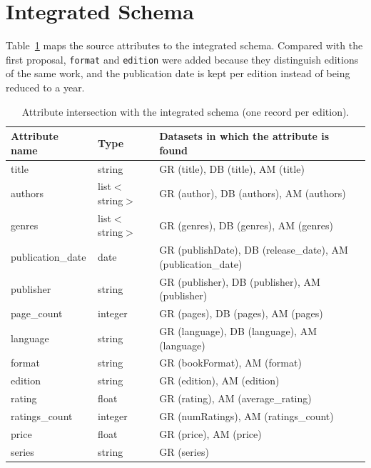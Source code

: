 \documentclass[runningheads]{llncs}
\begin{document}
\section{Integrated Schema}

Table~\ref{tab:schema} maps the source attributes to the integrated schema.
Compared with the first proposal, \texttt{format} and \texttt{edition} were
added because they distinguish editions of the same work, and the publication
date is kept per edition instead of being reduced to a year.

\begin{table}[htbp]
\centering
\begin{threeparttable}
\caption{Attribute intersection with the integrated schema (one record per edition).}
\label{tab:schema}
\footnotesize\setlength{\tabcolsep}{4pt}
\begin{tabularx}{\textwidth}{|l|l|>{\RaggedRight\arraybackslash}X|}
\hline
\textbf{Attribute name} & \textbf{Type} & \textbf{Datasets in which the attribute is found} \\
\hline
title             & string           & GR (title), DB (title), AM (title) \\
authors           & list$<$string$>$ & GR (author), DB (authors), AM (authors) \\
genres            & list$<$string$>$ & GR (genres), DB (genres), AM (genres) \\
publication\_date & date             & GR (publishDate), DB (release\_date), AM (publication\_date) \\
publisher         & string           & GR (publisher), DB (publisher), AM (publisher) \\
page\_count       & integer          & GR (pages), DB (pages), AM (pages) \\
language          & string           & GR (language), DB (language), AM (language) \\
format            & string           & GR (bookFormat), AM (format) \\
edition           & string           & GR (edition), AM (edition) \\
rating            & float            & GR (rating), AM (average\_rating) \\
ratings\_count    & integer          & GR (numRatings), AM (ratings\_count) \\
price             & float            & GR (price), AM (price) \\
series            & string           & GR (series) \\

\end{tabularx}
\end{threeparttable}
\end{table}
\end{document}
